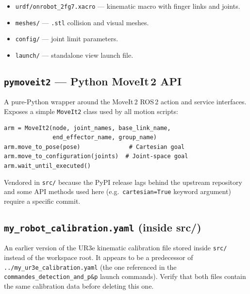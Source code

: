 \documentclass[11pt,a4paper]{article}
\newcommand{\file}[1]{\texttt{#1}}
\begin{document}
\begin{itemize}
  \item \file{urdf/onrobot\_2fg7.xacro} --- kinematic macro with finger links and joints.
  \item \file{meshes/} --- \texttt{.stl} collision and visual meshes.
  \item \file{config/} --- joint limit parameters.
  \item \file{launch/} --- standalone view launch file.
\end{itemize}

\subsection{\texttt{pymoveit2} --- Python MoveIt\,2 API}

A pure-Python wrapper around the MoveIt\,2 ROS\,2 action and service
interfaces. Exposes a simple \texttt{MoveIt2} class used by all motion
scripts:

\begin{verbatim}
arm = MoveIt2(node, joint_names, base_link_name,
              end_effector_name, group_name)
arm.move_to_pose(pose)              # Cartesian goal
arm.move_to_configuration(joints)  # Joint-space goal
arm.wait_until_executed()
\end{verbatim}

Vendored in \file{src/} because the PyPI release lags behind the upstream
repository and some API methods used here (e.g.\ \texttt{cartesian=True}
keyword argument) require a specific commit.

\subsection{\texttt{my\_robot\_calibration.yaml} (inside src/)}

An earlier version of the UR3e kinematic calibration file stored inside
\file{src/} instead of the workspace root. It appears to be a predecessor
of \file{../my\_ur3e\_calibration.yaml} (the one referenced in the
\file{commandes\_detection\_and\_p\&p} launch commands). Verify that both
files contain the same calibration data before deleting this one.

\newpage
\end{document}
